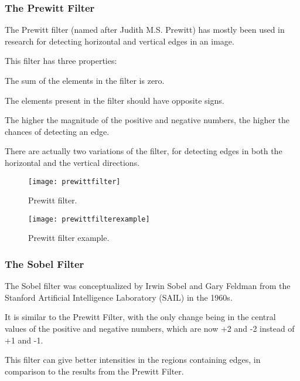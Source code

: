 	\subsubsection{The Prewitt Filter}
	\begin{bulletedlist}
		\item The Prewitt filter (named after Judith M.S. Prewitt) has mostly been used in research for detecting horizontal and vertical edges in an image.
		\item This filter has three properties:
		\begin{bulletedlist}
			\item The sum of the elements in the filter is zero.
			\item The elements present in the filter should have opposite signs.
			\item The higher the magnitude of the positive and negative numbers, the higher the chances of detecting an edge.
		\end{bulletedlist}
		\item There are actually two variations of the filter, for detecting edges in both the horizontal and the vertical
directions.
	\end{bulletedlist}

	\begin{figure}[h]
		\centering
		\texttt{[image: prewittfilter]}
		\caption[Prewitt filter]{Prewitt filter.}
		\label{fig:prewittfilter}
	\end{figure}
	\begin{figure}[h]
		\centering
		\texttt{[image: prewittfilterexample]}
		\caption[Prewitt filter example]{Prewitt filter example.}
		\label{fig:prewittfilterexample}
	\end{figure}

	\subsubsection{The Sobel Filter}
	\begin{bulletedlist}
		\item The Sobel filter was conceptualized by Irwin Sobel and Gary Feldman from the Stanford Artificial Intelligence Laboratory (SAIL) in the 1960s.
		\item It is similar to the Prewitt Filter, with the only change being in the central values of the positive and negative numbers, which are now +2 and -2 instead of +1 and -1.
		\item This filter can give better intensities in the regions containing edges, in comparison to the results from the Prewitt Filter.
	\end{bulletedlist}

